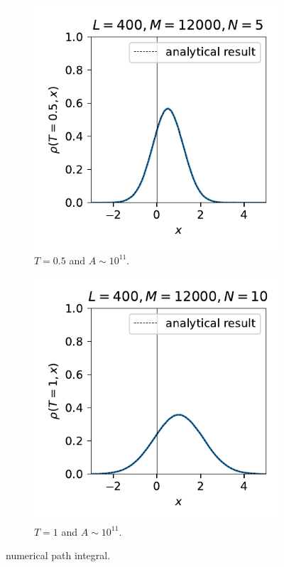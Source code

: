 \documentclass[10pt, a4paper]{article}
\numberwithin{equation}{section}
\begin{document}
\begin{itemize}
		\begin{figure}[H]
			\centering
			\begin{subfigure}{0.4\linewidth}
				\centering
				\includegraphics[scale=0.8]{figures/numerical path integral (normalized) of a free particle with initial state as a Gaussian wave packet and T=0.5 (L=400, M=12000, N=5).pdf}
				\caption{$T = 0.5$ and $A \sim 10^{11}$.}
			\end{subfigure}
			\begin{subfigure}{0.4\linewidth}
				\centering
				\includegraphics[scale=0.8]{figures/numerical path integral (normalized) of a free particle with initial state as a Gaussian wave packet and T=1 (L=400, M=12000, N=10).pdf}
				\caption{$T = 1$ and $A \sim 10^{11}$.}
			\end{subfigure}
			\caption{numerical path integral.}
		\end{figure}
	\end{itemize}
	
\end{document}
